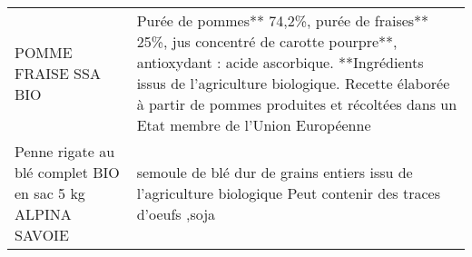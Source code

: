 \begin{longtable}{p{5cm}p{10cm}}
                                                                                     POMME FRAISE SSA BIO &                                                                                                                                                                                                                                                                                                                                                                                                                                                                                                                                                                                                                                                                                                                                                            Purée de pommes** 74,2\%, purée de fraises** 25\%, jus concentré de carotte pourpre**, antioxydant : acide ascorbique.   **Ingrédients issus de l'agriculture biologique.  Recette élaborée à partir de pommes produites et récoltées dans un Etat membre de l'Union Européenne \\
                                                Penne rigate au blé complet BIO en sac 5 kg ALPINA SAVOIE &                                                                                                                                                                                                                                                                                                                                                                                                                                                                                                                                                                                                                                                                                                                                                                                                                                                                                                                            semoule de blé dur de grains entiers issu de l'agriculture biologique  Peut contenir des traces d'oeufs ,soja \\

\end{longtable}
